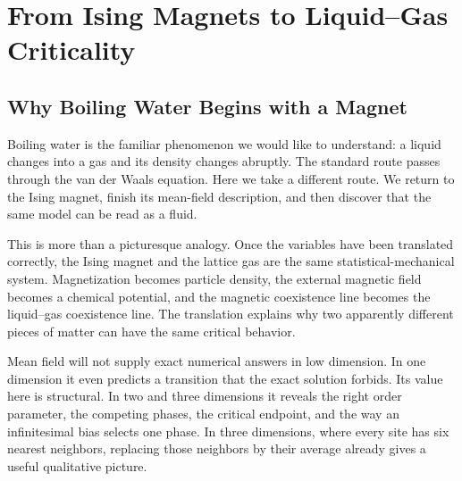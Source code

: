 \chapter{From Ising Magnets to Liquid--Gas Criticality}


\section{Why Boiling Water Begins with a Magnet}

Boiling water is the familiar phenomenon we would like to understand: a liquid changes into a gas and its density changes abruptly. The standard route passes through the van der Waals equation. Here we take a different route. We return to the Ising magnet, finish its mean-field description, and then discover that the same model can be read as a fluid.

This is more than a picturesque analogy. Once the variables have been translated correctly, the Ising magnet and the lattice gas are the same statistical-mechanical system. Magnetization becomes particle density, the external magnetic field becomes a chemical potential, and the magnetic coexistence line becomes the liquid--gas coexistence line. The translation explains why two apparently different pieces of matter can have the same critical behavior.

Mean field will not supply exact numerical answers in low dimension. In one dimension it even predicts a transition that the exact solution forbids. Its value here is structural. In two and three dimensions it reveals the right order parameter, the competing phases, the critical endpoint, and the way an infinitesimal bias selects one phase. In three dimensions, where every site has six nearest neighbors, replacing those neighbors by their average already gives a useful qualitative picture.

